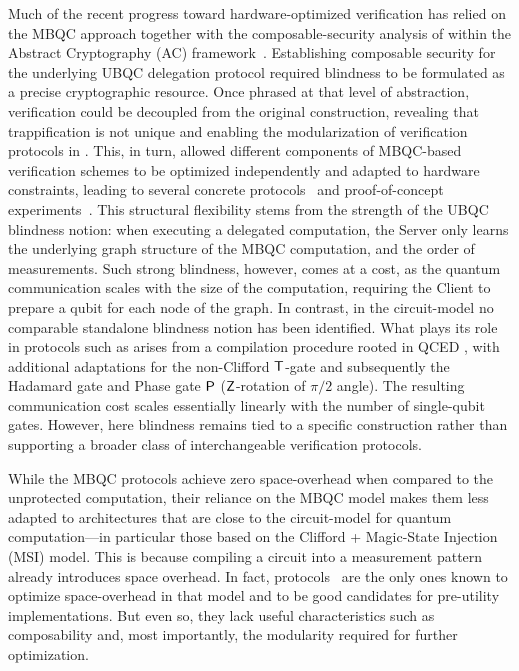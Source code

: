 Much of the recent progress toward hardware-optimized verification has relied on the MBQC approach together with the composable-security analysis of \cite{FK17unconditionally} within the Abstract Cryptography (AC) framework~\cite{MR11abstract}. Establishing composable security for the underlying UBQC delegation protocol required blindness to be formulated as a precise cryptographic resource. Once phrased at that level of abstraction, verification could be decoupled from the original construction, revealing that trappification is not unique and enabling the modularization of verification protocols in \cite{KKLM22unifying}. This, in turn, allowed different components of MBQC-based verification schemes to be optimized independently and adapted to hardware constraints, leading to several concrete protocols~\cite{KLMO24verification,GLMO25composably,YKO25verifiable} and proof-of-concept experiments~\cite{DNMN23verifiable,GLMM24chip,DIVF24design, BWMS25designing}. This structural flexibility stems from the strength of the UBQC blindness notion: when executing a delegated computation, the Server only learns the underlying graph structure of the MBQC computation, and the order of measurements. Such strong blindness, however, comes at a cost, as the quantum communication scales with the size of the computation, requiring the Client to prepare a qubit for each node of the graph. In contrast, in the circuit-model no comparable standalone blindness notion has been identified. What plays its role in protocols such as \cite{B18how} arises from a compilation procedure rooted in QCED \cite{B15delegating}, with additional adaptations for the non-Clifford $\T$-gate and subsequently the Hadamard gate and Phase gate $\P$ ($\Z$-rotation of $\pi/2$ angle). The resulting communication cost scales essentially linearly with the number of single-qubit gates. However, here blindness remains tied to a specific construction rather than supporting a broader class of interchangeable verification protocols.

While the MBQC protocols achieve zero space-overhead when compared to the unprotected computation, their reliance on the MBQC model makes them less adapted to architectures that are close to the circuit-model for quantum computation---in particular those based on the Clifford + Magic-State Injection (MSI) model. This is because compiling a circuit into a measurement pattern already introduces space overhead. In fact, protocols~\cite{B18how,BN25noise} are the only ones known to optimize space-overhead in that model and to be good candidates for pre-utility implementations. But even so, they lack useful characteristics such as composability and, most importantly, the modularity required for further optimization.

